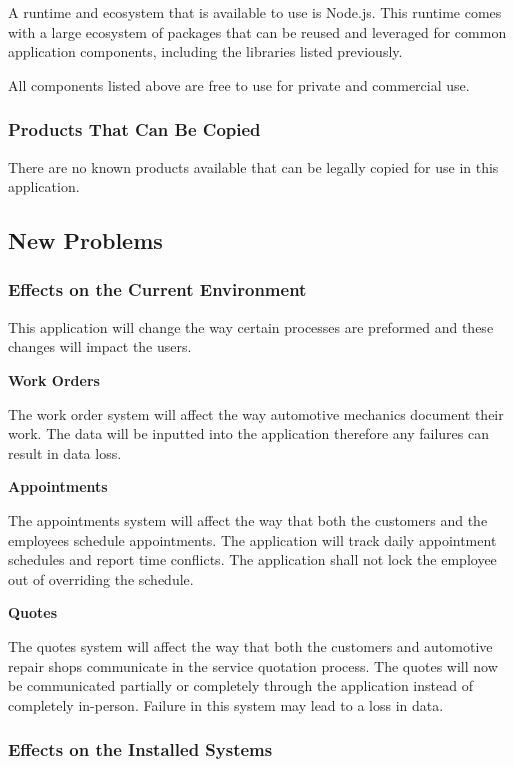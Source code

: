 \documentclass[12pt]{article}
\begin{document}
A runtime and ecosystem that is available to use is Node.js. This runtime comes with a large
ecosystem of packages that can be reused and leveraged for common application components, including
the libraries listed previously.

All components listed above are free to use for private and commercial use.

\subsubsection{Products That Can Be Copied}

There are no known products available that can be legally copied for use in this application.

\subsection{New Problems}

\subsubsection{Effects on the Current Environment}

This application will change the way certain processes are preformed and these changes will impact
the users.

\textbf{Work Orders}

The work order system will affect the way automotive mechanics document their work. The data will
be inputted into the application therefore any failures can result in data loss.

\textbf{Appointments}

The appointments system will affect the way that both the customers and the employees schedule
appointments. The application will track daily appointment schedules and report time conflicts. The
application shall not lock the employee out of overriding the schedule.

\textbf{Quotes}

The quotes system will affect the way that both the customers and automotive repair shops
communicate in the service quotation process. The quotes will now be communicated partially or
completely through the application instead of completely in-person. Failure in this system may lead
to a loss in data.

\subsubsection{Effects on the Installed Systems}
\end{document}
